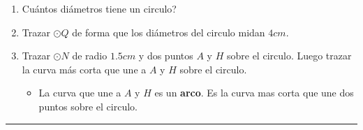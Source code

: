 \begin{act_clase}
\begin{enumerate}
\begin{itemize}
		 	\end{itemize}
	 	\item Cuántos diámetros tiene un circulo?
	 	\item Trazar $\odot Q$ de forma que los diámetros del circulo midan $4cm$.\vspace{5cm}
	 	\item Trazar $\odot N$ de radio $1.5cm$ y dos puntos $A$ y $H$ sobre el circulo. Luego trazar la curva más corta que une a $A$ y $H$ sobre el circulo.\vspace{4cm}
	 	\begin{itemize}
	 		\item La curva que une a $A$ y $H$ es un \textbf{arco}. Es la curva mas corta que une dos puntos sobre el circulo.
	 	\end{itemize}
	\end{enumerate}
\end{act_clase}
\rule{\textwidth}{0.1mm}

